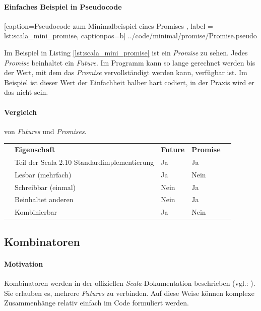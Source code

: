 \paragraph{Einfaches Beispiel in Pseudocode}


    [caption={Pseudocode zum Minimalbeispiel eines Promises },
       label = lst:scala_mini_promise,
       captionpos=b]
 {../code/minimal/promise/Promise.pseudo}
 
Im Beispiel in Listing \ref{lst:scala_mini_promise} ist ein \emph{Promise} zu sehen.
Jedes \emph{Promise} beinhaltet ein \emph{Future}. Im Programm kann
so lange gerechnet werden bis der Wert, mit dem das \emph{Promise}
vervollständigt werden kann, verfügbar ist. Im Beispiel ist dieser
Wert der Einfachheit halber hart codiert, in der Praxis wird er das
nicht sein.

\paragraph{Vergleich} von \emph{Futures} und \emph{Promises}.

\begin{table}[h]
\begin{tabular}{lllll}
 & \textbf{Eigenschaft} & \textbf{Future} & \textbf{Promise} &  \\
 & Teil der Scala 2.10 Standardimplementierung & Ja & Ja &  \\
 & Lesbar (mehrfach) & Ja & Nein &  \\
 & Schreibbar (einmal) & Nein & Ja &  \\
 & Beinhaltet anderen & Nein & Ja &  \\
 & Kombinierbar & Ja & Nein &  \\
\end{tabular}
\end{table}

\subsection{Kombinatoren}

\paragraph{Motivation} Kombinatoren werden in der offiziellen 
\emph{Scala}-Dokumentation beschrieben (vgl.: \cite{scalaDokuFP}).
Sie erlauben es, mehrere \emph{Futures} zu verbinden. 
Auf diese Weise können komplexe Zusammenhänge relativ einfach
im Code formuliert werden.

